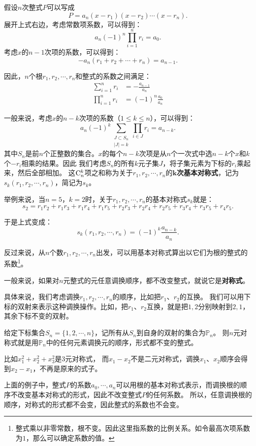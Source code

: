 \documentclass[12pt,UTF8,fontset=none]{ctexbook}
\begin{document}
假设$n$次整式$P$可以写成
$$ P = a_n (x - r_1)(x - r_2)\cdots (x - r_n).$$
展开上式右边，考虑常数项系数，可以得到：
$$ a_n (-1)^n \prod_{i=1}^n r_i = a_0.$$
考虑$x$的$n-1$次项的系数，可以得到：
$$ - a_n (r_1 + r_2 + \cdots + r_n) = a_{n-1}. $$

因此，$n$个根$r_1, r_2, \cdots , r_n$和整式的系数之间满足：
\begin{align*}
    \sum_{i=1}^n r_i &= -\frac{a_{n-1}}{a_n} \\
    \prod_{i=1}^n r_i &= (-1)^n \frac{a_0}{a_n}
\end{align*}

一般来说，考虑$x$的$n-k$次项的系数（$1\leqslant k \leqslant n$），可以得到：
$$ a_n (-1)^k \sum_{\substack{J\subset S_n\\|J|=k}} \prod_{i\in J}r_{i} = a_{n-k}. $$
其中$S_n$是前$n$个正整数的集合。$x$的每个$n-k$次项是从$n$个一次式中选$n-k$个$x$和$k$个$-r_i$相乘的结果。因此
我们考虑$S_n$的所有$k$元子集$J$，将子集元素为下标的$r_i$乘起来，然后全部相加。
这$\mathrm{C}_{n}^{k}$项之和称为关于$r_1, r_2, \cdots , r_n$的$\boldsymbol{k}$\textbf{次基本对称式}，记为$s_{k}(r_1, r_2, \cdots , r_n)$，简记为$s_k$。

举例来说，当$n=5$，$k=2$时，关于$r_1, r_2, \cdots , r_n$的基本对称式$s_{k}$就是：
$$ s_{2} = r_1r_2 + r_1r_3 + r_1r_4 + r_1r_5 + r_2r_3 + r_2r_4 + r_2r_5 + r_3r_4 + r_3r_5 + r_4r_5.$$

于是上式变成：
$$ s_{k}(r_1, r_2, \cdots , r_n) = (-1)^k \frac{a_{n-k}}{a_n}. $$

反过来说，从$n$个数$r_1, r_2, \cdots , r_n$出发，可以用基本对称式算出以它们为根的整式的系数\footnote{整式乘以非零常数，根不变。因此这里指系数的比例关系。如令最高次项系数为$1$，那么可以确定系数的值。}。

一般来说，如果对$n$元整式的元任意调换顺序，都不改变整式，就说它是\textbf{对称式}。

具体来说，我们考虑调换$r_1, r_2, \cdots , r_n$的顺序，比如把$r_1$、$r_2$的互换。
我们可以用下标的双射来表示这种调换操作。比如，把$r_1$、$r_2$互换，就是把$1,2$分别映射到$2,1$，其余下标不变的双射。

给定下标集合$S_n = \{1, 2, \cdots , n\}$，记所有从$S_n$到自身的双射的集合为$\mathbb{P}_n$。
则$n$元对称式就是用$\mathbb{P}_n$中的任何元素调换元的顺序，形式都不变的整式。

比如$x_1^2 + x_2^2 + x_3^2$是$3$元对称式，
而$x_1 - x_2$不是二元对称式，调换$x_1$、$x_2$顺序会得到$x_2 - x_1$，不再是原来的式子。

上面的例子中，整式$P$的系数$a_0, \cdots, a_n$可以用根的基本对称式表示，而调换根的顺序不改变基本对称式的形式，因此不改变整式$P$的任何系数。
所以，任意调换根的顺序，对称式的形式都不会变，因此整式的系数也不会变。
\end{document}
